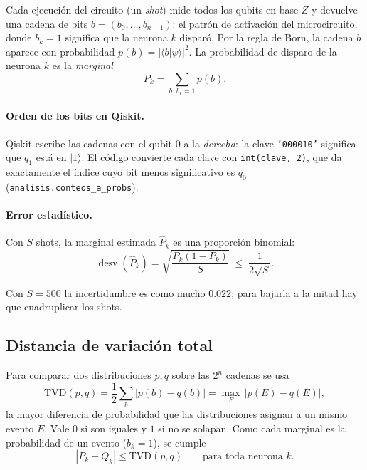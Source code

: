 \documentclass[11pt,a4paper]{article}
\renewcommand{\ket}[1]{\lvert #1\rangle}
\newcommand{\bk}[2]{\langle #1\vert #2\rangle}
\newcommand{\TVD}{\mathrm{TVD}}
\newcommand{\code}[1]{\texttt{#1}}
\theoremstyle{plain}
\theoremstyle{definition}
\theoremstyle{remark}
\begin{document}
Cada ejecución del circuito (un \emph{shot}) mide todos los qubits en base $Z$ y devuelve una cadena de bits $b=(b_0,\dots,b_{n-1})$: el patrón de activación del microcircuito, donde $b_k=1$ significa que la neurona $k$ disparó. Por la regla de Born, la cadena $b$ aparece con probabilidad $p(b)=|\bk{b}{\psi}|^2$. La probabilidad de disparo de la neurona $k$ es la \emph{marginal}
\begin{equation}
P_k = \sum_{b:\,b_k=1} p(b).
\end{equation}

\paragraph{Orden de los bits en Qiskit.} Qiskit escribe las cadenas con el qubit $0$ a la \emph{derecha}: la clave \code{'000010'} significa que $q_1$ está en $\ket1$. El código convierte cada clave con \code{int(clave, 2)}, que da exactamente el índice cuyo bit menos significativo es $q_0$ (\code{analisis.conteos\_a\_probs}).

\paragraph{Error estadístico.} Con $S$ shots, la marginal estimada $\hat P_k$ es una proporción binomial:
\begin{equation}
\operatorname{desv}(\hat P_k)=\sqrt{\frac{P_k(1-P_k)}{S}}\;\le\;\frac{1}{2\sqrt S}.
\end{equation}

Con $S=500$ la incertidumbre es como mucho $0.022$; para bajarla a la mitad hay que cuadruplicar los shots.

\subsection{Distancia de variación total}

Para comparar dos distribuciones $p,q$ sobre las $2^n$ cadenas se usa
\begin{equation}
\TVD(p,q) = \frac12\sum_b|p(b)-q(b)| = \max_{E}\,|p(E)-q(E)|,
\end{equation}
la mayor diferencia de probabilidad que las distribuciones asignan a un mismo evento $E$. Vale $0$ si son iguales y $1$ si no se solapan. Como cada marginal es la probabilidad de un evento ($b_k=1$), se cumple
\begin{equation}
|P_k - Q_k|\le\TVD(p,q)\qquad\text{para toda neurona }k.
\end{equation}
\end{document}
